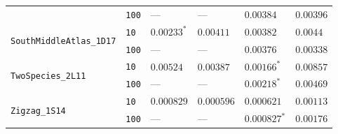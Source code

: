 \begin{footnotesize}
\begin{tabular}{llllll}
 & \texttt{100} & --- & --- & $\mathbf{0.00384}$ & $0.00396$ \\
\cline{1-6}
\multirow[c]{2}{*}{\texttt{SouthMiddleAtlas\_1D17}} & \texttt{10} & $\mathbf{0.00233}^*$ & $0.00411$ & $0.00382$ & $0.0044$ \\
 & \texttt{100} & --- & --- & $0.00376$ & $\mathbf{0.00338}$ \\
\cline{1-6}
\multirow[c]{2}{*}{\texttt{TwoSpecies\_2L11}} & \texttt{10} & $0.00524$ & $0.00387$ & $\mathbf{0.00166}^*$ & $0.00857$ \\
 & \texttt{100} & --- & --- & $\mathbf{0.00218}^*$ & $0.00469$ \\
\cline{1-6}
\multirow[c]{2}{*}{\texttt{Zigzag\_1S14}} & \texttt{10} & $0.000829$ & $\mathbf{0.000596}$ & $0.000621$ & $0.00113$ \\
 & \texttt{100} & --- & --- & $\mathbf{0.000827}^*$ & $0.00176$ \\
\cline{1-6}
\bottomrule
\end{tabular}
\end{footnotesize}
